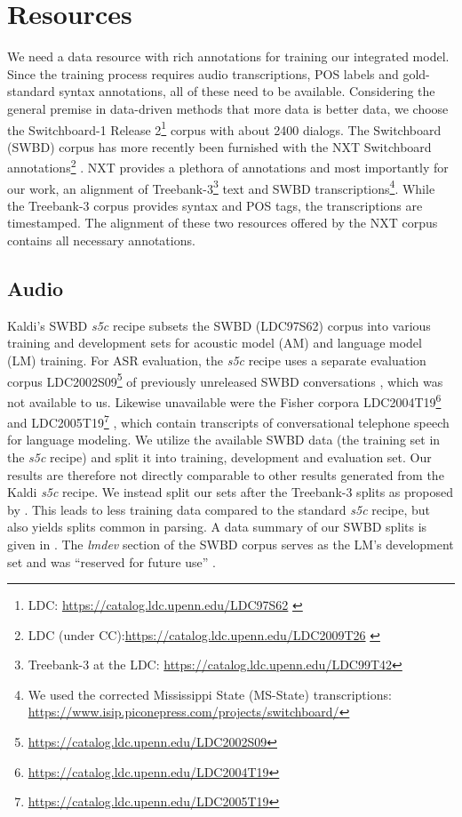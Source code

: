 \documentclass[11pt,letterpaper]{article}
\begin{document}
\section{Resources}\label{sec:res}
We need a data resource with rich annotations for training our integrated model. Since the training process requires audio transcriptions, POS labels and gold-standard syntax annotations, all of these need to be available. Considering the general premise in data-driven methods that more data is better data, we choose the Switchboard-1 Release 2\footnote{LDC: \url{https://catalog.ldc.upenn.edu/LDC97S62} \citep{GodfreyHolliman:1993}} \citep{GodfreyEtal:1992} corpus with about 2400 dialogs. The Switchboard (SWBD) corpus has more recently been furnished with the NXT Switchboard annotations\footnote{LDC (under CC):\newline \url{https://catalog.ldc.upenn.edu/LDC2009T26} \mbox{\citep{CalhounEtal:2009}}} \mbox{\citep{CalhounEtal:2010}}. NXT provides a plethora of annotations and most importantly for our work, an alignment of Treebank-3\footnote{Treebank-3 at the LDC: \url{https://catalog.ldc.upenn.edu/LDC99T42}} \citep{MitchellEtal:1999} text and SWBD transcriptions\footnote{We used the corrected Mississippi State (MS-State) transcriptions: \url{https://www.isip.piconepress.com/projects/switchboard/}}. While the Treebank-3 corpus provides syntax and POS tags, the transcriptions are timestamped. The alignment of these two resources offered by the NXT corpus contains all necessary annotations.

\subsection{Audio}\label{ssec:audio}
Kaldi's SWBD \emph{s5c} recipe subsets the SWBD (LDC97S62) corpus into various training and development sets for acoustic model (AM) and language model (LM) training. For ASR evaluation, the \emph{s5c} recipe uses a separate evaluation corpus LDC2002S09\footnote{\url{https://catalog.ldc.upenn.edu/LDC2002S09}} of previously unreleased SWBD conversations \citep{LDC:2002}, which was not available to us. Likewise unavailable were the Fisher corpora LDC2004T19\footnote{\url{https://catalog.ldc.upenn.edu/LDC2004T19}} \citep{CieriEtal:2004} and LDC2005T19\footnote{\url{https://catalog.ldc.upenn.edu/LDC2005T19}} \citep{CieriEtal:2005}, which contain transcripts of conversational telephone speech for language modeling. We utilize the available SWBD data (the training set in the \emph{s5c} recipe) and split it into training, development and evaluation set. Our results are therefore not directly comparable to other results generated from the Kaldi \emph{s5c} recipe. We instead split our sets after the Treebank-3 splits as proposed by \citet{CharniakJohnson:2001}. This leads to less training data compared to the standard \emph{s5c} recipe, but also yields splits common in parsing. A data summary of our SWBD splits is given in . The \emph{lmdev} section of the SWBD corpus serves as the LM's development set and was ``reserved for future use'' \citep[p. 121]{CharniakJohnson:2001}.
\end{document}
